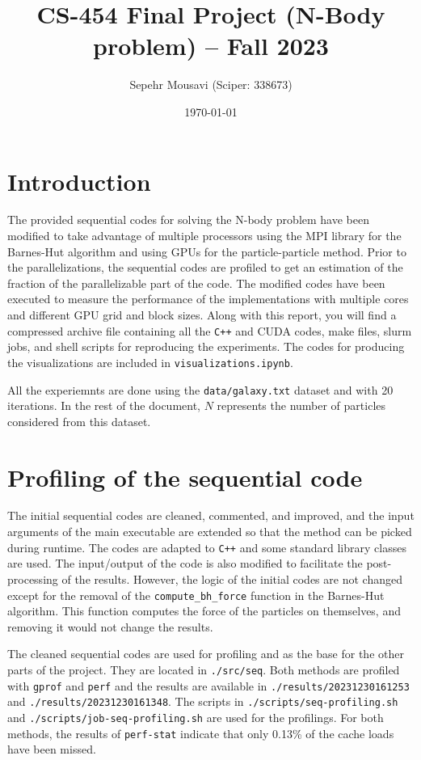 \documentclass[10pt,journal,compsocconf]{IEEEtran}
\title{CS-454 Final Project (N-Body problem) -- Fall 2023}
\author{
  Sepehr Mousavi (Sciper: 338673)
}
\date{\today}
\newcommand{\code}[1]{\texttt{#1}}
\begin{document}
\maketitle

\section{Introduction}

The provided sequential codes for solving the N-body problem have been modified to take advantage of multiple processors using the MPI library for the Barnes-Hut algorithm and using GPUs for the particle-particle method. Prior to the parallelizations, the sequential codes are profiled to get an estimation of the fraction of the parallelizable part of the code. The modified codes have been executed to measure the performance of the implementations with multiple cores and different GPU grid and block sizes. Along with this report, you will find a compressed archive file containing all the \code{C++} and CUDA codes, make files, slurm jobs, and shell scripts for reproducing the experiments. The codes for producing the visualizations are included in \code{visualizations.ipynb}.

All the experiemnts are done using the \code{data/galaxy.txt} dataset and with 20 iterations. In the rest of the document, $N$ represents the number of particles considered from this dataset.

\section{Profiling of the sequential code}

The initial sequential codes are cleaned, commented, and improved, and the input arguments of the main executable are extended so that the method can be picked during runtime. The codes are adapted to \code{C++} and some standard library classes are used. The input/output of the code is also modified to facilitate the post-processing of the results. However, the logic of the initial codes are not changed except for the removal of the \code{compute\_bh\_force} function in the Barnes-Hut algorithm. This function computes the force of the particles on themselves, and removing it would not change the results.

The cleaned sequential codes are used for profiling and as the base for the other parts of the project. They are located in \code{./src/seq}. Both methods are profiled with \code{gprof} and \code{perf} and the results are available in \code{./results/20231230161253} and \code{./results/20231230161348}. The scripts in \code{./scripts/seq-profiling.sh} and \code{./scripts/job-seq-profiling.sh} are used for the profilings. For both methods, the results of \code{perf-stat} indicate that only 0.13\% of the cache loads have been missed.
\end{document}
